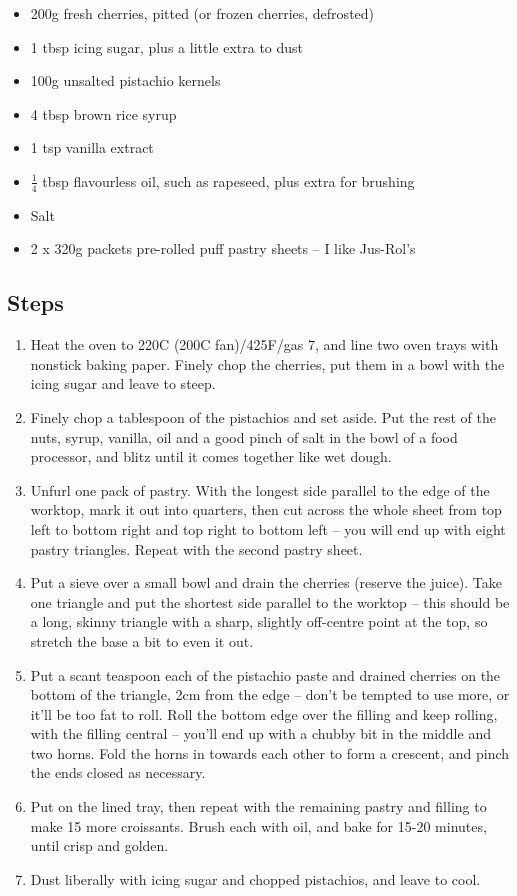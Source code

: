 \documentclass{book}
\begin{document}
\begin{itemize}
\item 200g fresh cherries, pitted (or frozen cherries, defrosted)
\item 1 tbsp icing sugar, plus a little extra to dust
\item 100g unsalted pistachio kernels 
\item 4 tbsp brown rice syrup 
\item 1 tsp vanilla extract 
\item $\frac{1}{4}$ tbsp flavourless oil, such as rapeseed, plus extra for brushing
\item Salt
\item 2 x 320g packets pre-rolled puff pastry sheets – I like Jus-Rol’s
\end{itemize}

\subsection*{Steps}
\begin{enumerate}
\item Heat the oven to 220C (200C fan)/425F/gas 7, and line two oven trays with nonstick baking paper. Finely chop the cherries, put them in a bowl with the icing sugar and leave to steep.
\item Finely chop a tablespoon of the pistachios and set aside. Put the rest of the nuts, syrup, vanilla, oil and a good pinch of salt in the bowl of a food processor, and blitz until it comes together like wet dough.
\item Unfurl one pack of pastry. With the longest side parallel to the edge of the worktop, mark it out into quarters, then cut across the whole sheet from top left to bottom right and top right to bottom left – you will end up with eight pastry triangles. Repeat with the second pastry sheet.
\item Put a sieve over a small bowl and drain the cherries (reserve the juice). Take one triangle and put the shortest side parallel to the worktop – this should be a long, skinny triangle with a sharp, slightly off-centre point at the top, so stretch the base a bit to even it out.
\item Put a scant teaspoon each of the pistachio paste and drained cherries on the bottom of the triangle, 2cm from the edge – don’t be tempted to use more, or it’ll be too fat to roll. Roll the bottom edge over the filling and keep rolling, with the filling central – you’ll end up with a chubby bit in the middle and two horns. Fold the horns in towards each other to form a crescent, and pinch the ends closed as necessary.
\item Put on the lined tray, then repeat with the remaining pastry and filling to make 15 more croissants. Brush each with oil, and bake for 15-20 minutes, until crisp and golden.
\item Dust liberally with icing sugar and chopped pistachios, and leave to cool.
\end{enumerate}
\newpage
\end{document}
